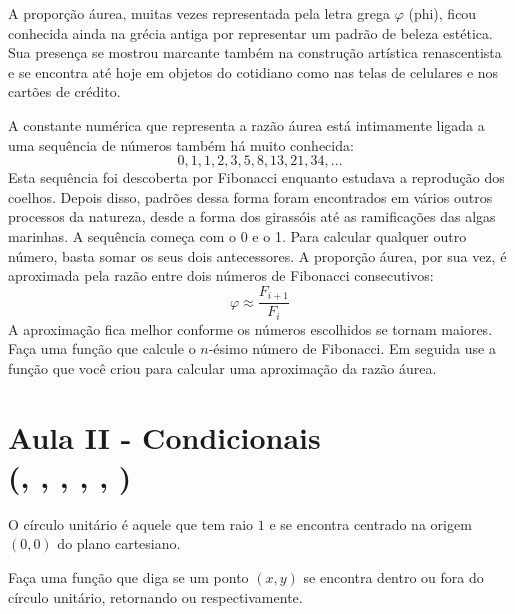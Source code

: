     
    
        A proporção áurea, muitas vezes representada pela letra grega $\varphi$ (phi), ficou conhecida ainda na grécia antiga por representar um padrão de beleza estética. Sua presença se mostrou marcante também na construção artística renascentista e se encontra até hoje em objetos do cotidiano como nas telas de celulares e nos cartões de crédito.
        
        
        
        A constante numérica que representa a razão áurea está intimamente ligada a uma sequência de números também há muito conhecida:
        $$0, 1, 1, 2, 3, 5, 8, 13, 21, 34, ...$$
        Esta sequência foi descoberta por Fibonacci enquanto estudava a reprodução dos coelhos. Depois disso, padrões dessa forma foram encontrados em vários outros processos da natureza, desde a forma dos girassóis até as ramificações das algas marinhas. A sequência começa com o 0 e o 1. Para calcular qualquer outro número, basta somar os seus dois antecessores. A proporção áurea, por sua vez, é aproximada pela razão entre dois números de Fibonacci consecutivos:
        $$\varphi \approx \frac{F_{i+1}}{F_{i}}$$
        A aproximação fica melhor conforme os números escolhidos se tornam maiores.\\
        
        \quest Faça uma função que calcule o $n$-ésimo número de Fibonacci. Em seguida use a função que você criou para calcular uma aproximação da razão áurea.
        
        
        
        \pagebreak
        
        \section{Aula II - Condicionais \\(, , , , , )}
        
        
        O círculo unitário é aquele que tem raio $1$ e se encontra centrado na origem $(0, 0)$ do plano cartesiano.
        
        
        
        \quest Faça uma função que diga se um ponto $(x, y)$ se encontra dentro ou fora do círculo unitário, retornando  ou  respectivamente.\\
        
